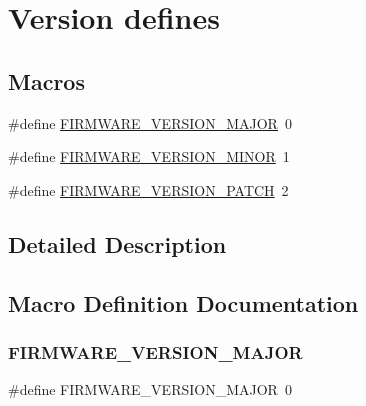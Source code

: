 \hypertarget{group___firmware}{}\section{Version defines}
\label{group___firmware}
\subsection*{Macros}
\begin{DoxyCompactItemize}
\item 
\#define \mbox{\hyperlink{group___firmware_gac260f4e3fdc195e24211f88ed511cf95}{F\+I\+R\+M\+W\+A\+R\+E\+\_\+\+V\+E\+R\+S\+I\+O\+N\+\_\+\+M\+A\+J\+OR}}~0
\item 
\#define \mbox{\hyperlink{group___firmware_ga4d15f2bd6406aef36866960b4a6690a2}{F\+I\+R\+M\+W\+A\+R\+E\+\_\+\+V\+E\+R\+S\+I\+O\+N\+\_\+\+M\+I\+N\+OR}}~1
\item 
\#define \mbox{\hyperlink{group___firmware_ga08bf7fdb1aa8e63f314631f5926e10e7}{F\+I\+R\+M\+W\+A\+R\+E\+\_\+\+V\+E\+R\+S\+I\+O\+N\+\_\+\+P\+A\+T\+CH}}~2
\end{DoxyCompactItemize}


\subsection{Detailed Description}


\subsection{Macro Definition Documentation}
\mbox{\label{group___firmware_gac260f4e3fdc195e24211f88ed511cf95}} 
\subsubsection{\texorpdfstring{F\+I\+R\+M\+W\+A\+R\+E\+\_\+\+V\+E\+R\+S\+I\+O\+N\+\_\+\+M\+A\+J\+OR}{FIRMWARE\_VERSION\_MAJOR}}
{\footnotesize\ttfamily \#define F\+I\+R\+M\+W\+A\+R\+E\+\_\+\+V\+E\+R\+S\+I\+O\+N\+\_\+\+M\+A\+J\+OR~0}

